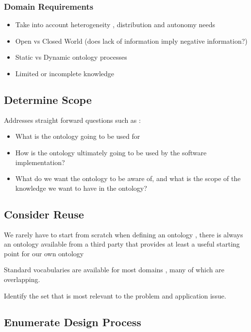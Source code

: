 \documentclass{article}
\begin{document}
\subsubsection{Domain Requirements}

\begin{itemize}
    \item Take into account heterogeneity , distribution and autonomy needs
    \item Open vs Closed World (does lack of information imply negative information?)
    \item Static vs Dynamic ontology processes
    \item Limited or incomplete knowledge
\end{itemize}

\subsection{Determine Scope}

Addresses straight forward questions such as : 

\begin{itemize}
    \item What is the ontology going to be used for
    \item How is the ontology ultimately going to be used by the software implementation?
    \item What do we want the ontology to be aware of, and what is the scope of the knowledge we want to have in the ontology?
\end{itemize}

\subsection{Consider Reuse}

We rarely have to start from scratch when defining an ontology , there is always an ontology available from a third party that provides at least a useful starting point for our own ontology

Standard vocabularies are available for most domains , many of which are overlapping.

Identify the set that is most relevant to the problem and application issue.

\subsection{Enumerate Design Process}
\end{document}
